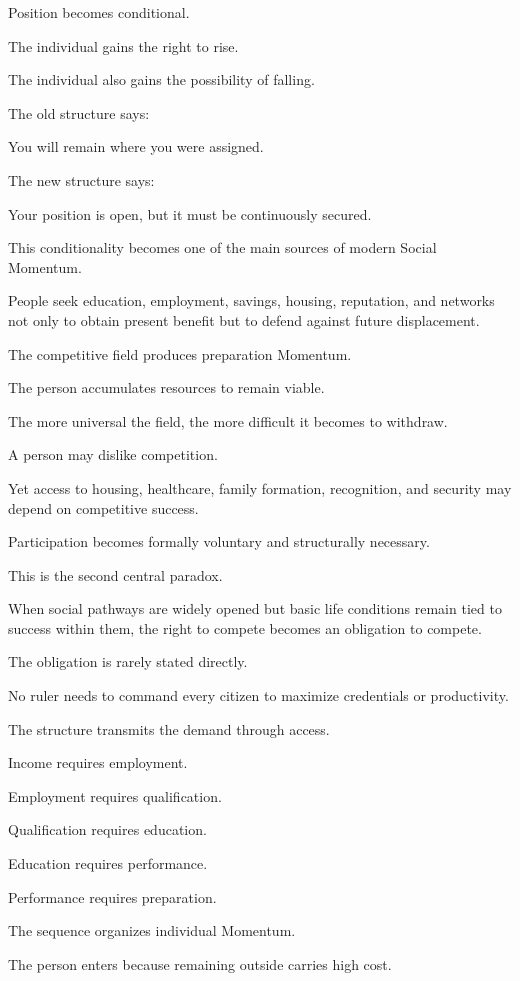 Position becomes conditional.

The individual gains the right to rise.

The individual also gains the possibility of falling.

The old structure says:

You will remain where you were assigned.

The new structure says:

Your position is open, but it must be continuously secured.

This conditionality becomes one of the main sources of modern Social Momentum.

People seek education, employment, savings, housing, reputation, and networks not only to obtain present benefit but to defend against future displacement.

The competitive field produces preparation Momentum.

The person accumulates resources to remain viable.

The more universal the field, the more difficult it becomes to withdraw.

A person may dislike competition.

Yet access to housing, healthcare, family formation, recognition, and security may depend on competitive success.

Participation becomes formally voluntary and structurally necessary.

This is the second central paradox.

When social pathways are widely opened but basic life conditions remain tied to success within them, the right to compete becomes an obligation to compete.

The obligation is rarely stated directly.

No ruler needs to command every citizen to maximize credentials or productivity.

The structure transmits the demand through access.

Income requires employment.

Employment requires qualification.

Qualification requires education.

Education requires performance.

Performance requires preparation.

The sequence organizes individual Momentum.

The person enters because remaining outside carries high cost.

